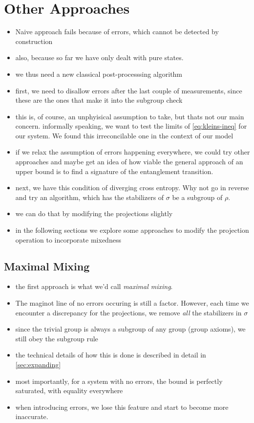 \section{Other Approaches}\label{sec:other-approaches}
\begin{itemize}
  \item Naive approach fails because of errors, which cannot be detected by
    construction
  \item also, because so far we have only dealt with pure states.
  \item we thus need a new classical post-processsing algorithm
  \item first, we need to disallow errors after the last couple of
    measurements, since these are the ones that make it into the subgroup check
  \item this is, of course, an unphyisical assumption to take, but thats not
    our main concern. informally speaking, we want to test the limits of
    \cref{eq:kleins-ineq} for our system. We found this irreconcilable one in
    the context of our model
  \item if we relax the assumption of errors happening everywhere, we could try
    other approaches and maybe get an idea of how viable the general approach
    of an upper bound is to find a signature of the entanglement transition.
  \item next, we have this condition of diverging cross entropy. Why not go in
    reverse and try an algorithm, which has the stabilizers of $\sigma$ be a
    subgroup of $\rho$.
  \item we can do that by modifying the projections slightly
  \item in the following sections we explore some approaches to modify the
    projection operation to incorporate mixedness
\end{itemize}
\subsection{Maximal Mixing}\label{sec:maximal-mixing}
\begin{itemize}
  \item the first approach is what we'd call \emph{maximal mixing}.
  \item The maginot line of no errors occuring is still a factor. However, each
    time we encounter a discrepancy for the projections, we remove \emph{all}
    the stabilizers in $\sigma$
  \item since the trivial group is always a subgroup of any group (group
    axioms), we still obey the subgroup rule
  \item the technical details of how this is done is described in detail in
    \cref{sec:expanding}
  \item most importantly, for a system with no errors, the bound is perfectly
    saturated, with equality everywhere
  \item when introducing errors, we lose this feature and start to become more
    inaccurate.
\end{itemize}
